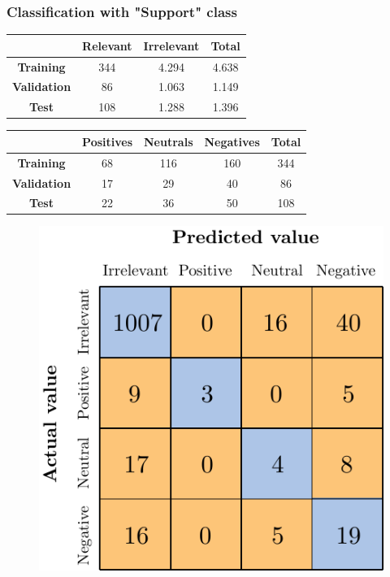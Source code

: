 \subsubsection{Classification with "Support" class}


\begin{center}
	\begin{tabular}{ | c  c  c | c | } 
		\hline
		& \textbf{Relevant} & \textbf{Irrelevant} & \textbf{Total} \\
		\hline
		\textbf{Training} & 344 & 4.294 & 4.638 \\ 
		\hline
		\textbf{Validation} & 86 & 1.063 & 1.149 \\ 
		\hline
		\textbf{Test} & 108 & 1.288 & 1.396 \\
		\hline
	\end{tabular}
\end{center}


\begin{center}
	\begin{tabular}{ | c  c  c c | c | } 
		\hline
		& \textbf{Positives} & \textbf{Neutrals} & \textbf{Negatives} & \textbf{Total} \\
		\hline
		\textbf{Training} & 68 & 116 & 160 & 344 \\ 
		\hline
		\textbf{Validation} & 17 & 29 & 40 & 86 \\ 
		\hline
		\textbf{Test} & 22 & 36 & 50 & 108 \\
		\hline
	\end{tabular}
\end{center}


\begin{figure}[H]
	\centering
	\includegraphics[scale=1]{figures/conf_matrices/ita_support/ita_cascade_support_bpef_val.pdf}
	\label{fig:ita_cascade_support_bpef_val}
\end{figure}


